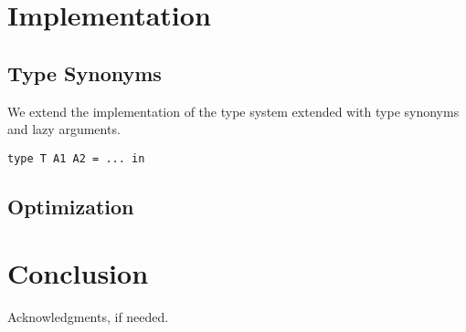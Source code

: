 \documentclass[preprint]{sigplanconf}
\begin{document}




\section{Implementation}

\subsection{Type Synonyms}

We extend the implementation of the type system extended with type synonyms and
lazy arguments.

\begin{lstlisting}
type T A1 A2 = ... in
\end{lstlisting}

\subsection{Optimization}



\section{Conclusion}

\acks

Acknowledgments, if needed.

\appendix






\nocite{*}






\end{document}
